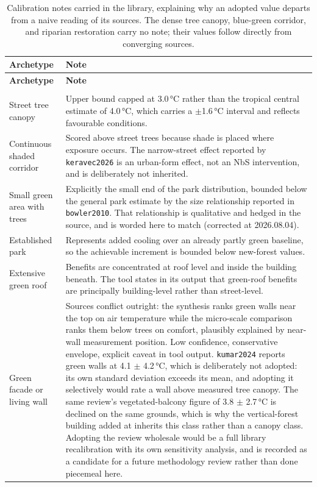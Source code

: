 \begin{longtable}{@{}>{\raggedright\arraybackslash}p{30mm}
                    >{\raggedright\arraybackslash}p{95mm}@{}}
\caption[Archetype calibration notes]{Calibration notes carried in the library,
explaining why an adopted value departs from a naive reading of its sources.
The dense tree canopy, blue-green corridor, and riparian restoration carry no
note; their values follow directly from converging sources.}
\label{tab:app-notes}\\
\toprule
\textbf{Archetype} & \textbf{Note} \\
\midrule
\endfirsthead
\toprule
\textbf{Archetype} & \textbf{Note} \\
\midrule
\endhead
\midrule
\multicolumn{2}{r@{}}{\small\itshape continued on next page}\\
\endfoot
\bottomrule
\endlastfoot
Street tree canopy &
Upper bound capped at 3.0\,\si{\degreeCelsius} rather than the tropical central estimate of 4.0\,\si{\degreeCelsius}, which carries a $\pm$1.6\,\si{\degreeCelsius} interval and reflects favourable conditions. \\
\addlinespace
Continuous shaded corridor &
Scored above street trees because shade is placed where exposure occurs. The narrow-street effect reported by \texttt{keravec2026} is an urban-form effect, not an NbS intervention, and is deliberately not inherited. \\
\addlinespace
Small green area with trees &
Explicitly the small end of the park distribution, bounded below the general park estimate by the size relationship reported in \texttt{bowler2010}. That relationship is qualitative and hedged in the source, and is worded here to match (corrected at 2026.08.04). \\
\addlinespace
Established park &
Represents added cooling over an already partly green baseline, so the achievable increment is bounded below new-forest values. \\
\addlinespace
Extensive green roof &
Benefits are concentrated at roof level and inside the building beneath. The tool states in its output that green-roof benefits are principally building-level rather than street-level. \\
\addlinespace
Green facade or living wall &
Sources conflict outright: the synthesis ranks green walls near the top on air temperature while the micro-scale comparison ranks them below trees on comfort, plausibly explained by near-wall measurement position. Low confidence, conservative envelope, explicit caveat in tool output. \texttt{kumar2024} reports green walls at 4.1 $\pm$ 4.2\,\si{\degreeCelsius}, which is deliberately not adopted: its own standard deviation exceeds its mean, and adopting it selectively would rate a wall above measured tree canopy. The same review's vegetated-balcony figure of 3.8 $\pm$ 2.7\,\si{\degreeCelsius} is declined on the same grounds, which is why the vertical-forest building added at \methver{} inherits this class rather than a canopy class. Adopting the review wholesale would be a full library recalibration with its own sensitivity analysis, and is recorded as a candidate for a future methodology review rather than done piecemeal here. \\

\end{longtable}
